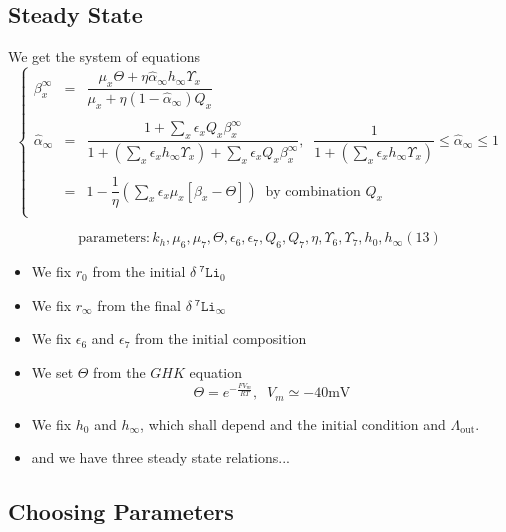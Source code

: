 \documentclass[aps,onecolumn,10pt]{revtex4}
\newcommand{\mychem}[1]{\mathtt{#1}}
\newcommand{\spLi}[1]{{~^{\mychem{#1}}\mychem{Li}}}
\newcommand{\deltaLi}{ {\delta\!\!\!\spLi{7}} }
\newcommand{\LiAll}{\Lambda}
\newcommand{\LiAllOut}{{\LiAll}_{\mathrm{out}}}
\begin{document}
\subsection{Steady State}
We get the system of equations
\begin{equation}
\label{eq:steady}
\left\lbrace
\begin{array}{rcl}
	\beta_x^\infty & = & \dfrac{\mu_x\Theta + \eta \hat\alpha_\infty h_\infty \Upsilon_x}{\mu_x + \eta (1-\hat\alpha_\infty) Q_x}\\\
	\\
	\hat\alpha_\infty & = & \dfrac{1+\sum_x\epsilon_x Q_x\beta_x^\infty
	}{1 + \left(\sum_x \epsilon_x h_\infty \Upsilon_x \right) + \sum_x\epsilon_x Q_x\beta_x^\infty
	}, \;\; \dfrac{1}{1+\left(\sum_x \epsilon_x h_\infty \Upsilon_x \right)}\leq\hat\alpha_\infty \leq 1\\\
	\\
	& = & 1 - \dfrac{1}{\eta}\left( \sum_x \epsilon_x \mu_x \left[\beta_x - \Theta\right]\right) \;\; \text{by combination } Q_x\\
\end{array}
\right.
\end{equation}

\begin{equation}
\text{parameters} : k_h, \mu_6, \mu_7, \Theta, \epsilon_6, \epsilon_7, Q_6, Q_7, \eta, \Upsilon_6, \Upsilon_7, h_0, h_\infty (13)
\end{equation}

\begin{itemize}
	\item We fix $r_0$ from the initial $\deltaLi_0$
	\item We fix $r_\infty$ from the final $\deltaLi_\infty$
	\item We fix $\epsilon_6$ and $\epsilon_7$ from the initial composition
	\item We set $\Theta$ from the $GHK$ equation
	$$
		\Theta = e^{ -\frac{FV_m}{RT} },\;\;V_m\simeq -40\text{mV}
	$$
	\item We fix $h_0$ and $h_\infty$, which shall depend and the initial condition and $\LiAllOut$.
	\item and we have three steady state relations...
\end{itemize}

\subsection{Choosing Parameters}
\end{document}
